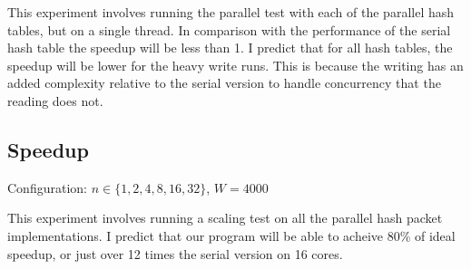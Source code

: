 This experiment involves running the parallel test with each of the
parallel hash tables, but on a single thread.  In comparison with the
performance of the serial hash table the speedup will be less than
1. I predict that for all hash tables, the speedup will be lower for
the heavy write runs.  This is because the writing has an added
complexity relative to the serial version to handle concurrency that
the reading does not.

\subsection{Speedup}

Configuration: $n \in \{1, 2, 4, 8, 16, 32\}$, $W = 4000$

This experiment involves running a scaling test on all the parallel
hash packet implementations.  I predict that our program will be able
to acheive 80\% of ideal speedup, or just over 12 times the serial
version on 16 cores.  







